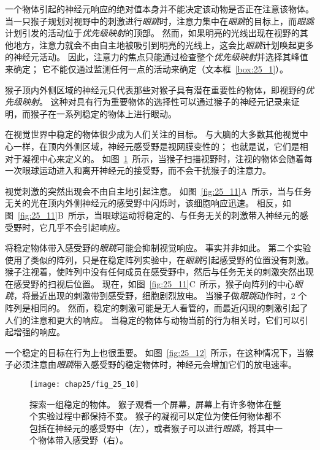 一个物体引起的神经元响应的绝对值本身并不能决定该动物是否正在注意该物体。
当一只猴子规划对视野中的刺激进行\textit{眼跳}时，注意力集中在\textit{眼跳}的目标上，而\textit{眼跳}计划引发的活动位于\textit{优先级映射}的顶部。
然而，如果明亮的光线出现在视野的其他地方，注意力就会不由自主地被吸引到明亮的光线上，这会比\textit{眼跳}计划唤起更多的神经元活动。
因此，注意力的焦点只能通过检查整个\textit{优先级映射}并选择其峰值来确定；
它不能仅通过监测任何一点的活动来确定（文本框~\ref{box:25_1}）。


\begin{proposition} \label{box:25_1}
	
	\quad \quad 猴子顶内外侧区域的神经元只代表那些对猴子具有潜在重要性的物体，即视野的\textit{优先级映射}。
	这种对具有行为重要物体的选择性可以通过猴子的神经元记录来证明，而猴子在一系列稳定的物体上进行眼动。
	
	\quad \quad 在视觉世界中稳定的物体很少成为人们关注的目标。
	与大脑的大多数其他视觉中心一样，在顶内外侧区域，神经元感受野是视网膜变性的；
	也就是说，它们是相对于凝视中心来定义的。
	如图~\ref{fig:25_10}~所示，当猴子扫描视野时，注视的物体会随着每一次眼球运动进入和离开神经元的接受野，而不会干扰猴子的注意力。
	
	\quad \quad 视觉刺激的突然出现会不由自主地引起注意。
	如图~\ref{fig:25_11}A~所示，当与任务无关的光在顶内外侧神经元的感受野中闪烁时，该细胞响应迅速。
	相反，如图~\ref{fig:25_11}B~所示，当眼球运动将稳定的、与任务无关的刺激带入神经元的感受野时，它几乎不会引起响应。
	
	\quad \quad 将稳定物体带入感受野的\textit{眼跳}可能会抑制视觉响应。
	事实并非如此。
	第二个实验使用了类似的阵列，只是在稳定阵列实验中，在\textit{眼跳}引起感受野的位置没有刺激。
	猴子注视着，使阵列中没有任何成员在感受野中，然后与任务无关的刺激突然出现在感受野的扫视后位置。
	现在，如图~\ref{fig:25_11}C~所示，猴子向阵列的中心\textit{眼跳}，将最近出现的刺激带到感受野，细胞剧烈放电。
	当猴子做\textit{眼跳}动作时，2 个阵列是相同的。
	然而，稳定的刺激可能是无人看管的，而最近闪现的刺激引起了人们的注意和更大的响应。
	当稳定的物体与动物当前的行为相关时，它们可以引起增强的响应。
	
	\quad \quad 一个稳定的目标在行为上也很重要。
	如图~\ref{fig:25_12}~所示，在这种情况下，当猴子必须注意由\textit{眼跳}带入感受野的稳定物体时，神经元会增加它们的放电速率。
	
\end{proposition}


\begin{figure}[htbp]
	\centering
	\texttt{[image: chap25/fig\_25\_10]}
	\caption{探索一组稳定的物体。
		猴子观看一个屏幕，屏幕上有许多物体在整个实验过程中都保持不变。
		猴子的凝视可以定位为使任何物体都不包括在神经元的感受野中（左），或者猴子可以进行\textit{眼跳}，将其中一个物体带入感受野（右）。}
	\label{fig:25_10}
\end{figure}


